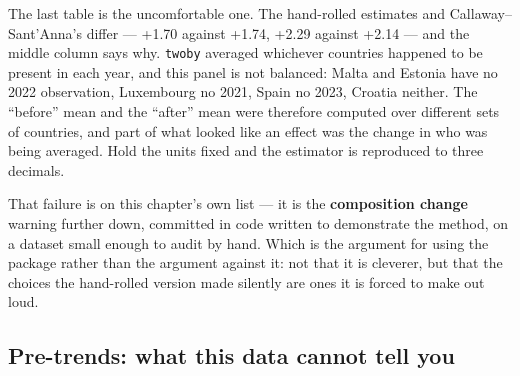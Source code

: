 \documentclass[
  letterpaper,
  10pt,
  twoside,
  openright,
  numbers=noenddot,
  chapterprefix=true]{scrbook}
\begin{document}
The last table is the uncomfortable one. The hand-rolled estimates and
Callaway--Sant'Anna's differ --- +1.70 against +1.74, +2.29 against
+2.14 --- and the middle column says why. \texttt{twoby} averaged
whichever countries happened to be present in each year, and this panel
is not balanced: Malta and Estonia have no 2022 observation, Luxembourg
no 2021, Spain no 2023, Croatia neither. The ``before'' mean and the
``after'' mean were therefore computed over different sets of countries,
and part of what looked like an effect was the change in who was being
averaged. Hold the units fixed and the estimator is reproduced to three
decimals.

That failure is on this chapter's own list --- it is the
\textbf{composition change} warning further down, committed in code
written to demonstrate the method, on a dataset small enough to audit by
hand. Which is the argument for using the package rather than the
argument against it: not that it is cleverer, but that the choices the
hand-rolled version made silently are ones it is forced to make out
loud.

\subsection{Pre-trends: what this data cannot tell
you}\label{pre-trends-what-this-data-cannot-tell-you}
\end{document}
